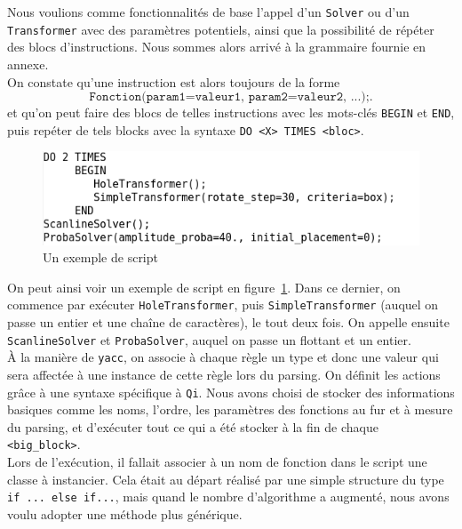 Nous voulions comme fonctionnalités de base l'appel d'un \texttt{Solver} ou d'un \texttt{Transformer} avec des paramètres potentiels, ainsi que la possibilité de répéter des blocs d'instructions. Nous sommes alors arrivé à la grammaire fournie en annexe.\\

On constate qu'une instruction est alors toujours de la forme
$$\texttt{Fonction(param1=valeur1, param2=valeur2, ...);}.$$
et qu'on peut faire des blocs de telles instructions avec les mots-clés \texttt{BEGIN} et \texttt{END}, puis repéter de tels blocks avec la syntaxe \texttt{DO <X> TIMES <bloc>}.\\

\begin{figure}[H]
\centering
\includegraphics[scale=0.6]{img/closeEnough.png}
\caption{Un exemple de script}
\label{fig:closeEnough}
\end{figure}

On peut ainsi voir un exemple de script en figure~\ref{fig:closeEnough}. Dans ce dernier, on commence par exécuter \texttt{HoleTransformer}, puis \texttt{SimpleTransformer} (auquel on passe un entier et une chaîne de caractères), le tout deux fois. On appelle ensuite \texttt{ScanlineSolver} et \texttt{ProbaSolver}, auquel on passe un flottant et un entier.\\

À la manière de \texttt{yacc}, on associe à chaque règle un type et donc une valeur qui sera affectée à une instance de cette règle lors du parsing. On définit les actions grâce à une syntaxe spécifique à \texttt{Qi}. Nous avons choisi de stocker des informations basiques comme les noms, l'ordre, les paramètres des fonctions au fur et à mesure du parsing, et d'exécuter tout ce qui a été stocker à la fin de chaque \texttt{<big\_block>}.\\

Lors de l'exécution, il fallait associer à un nom de fonction dans le script une classe à instancier. Cela était au départ réalisé par une simple structure du type \texttt{if ... else if...}, mais quand le nombre d'algorithme a augmenté, nous avons voulu adopter une méthode plus générique.\\

